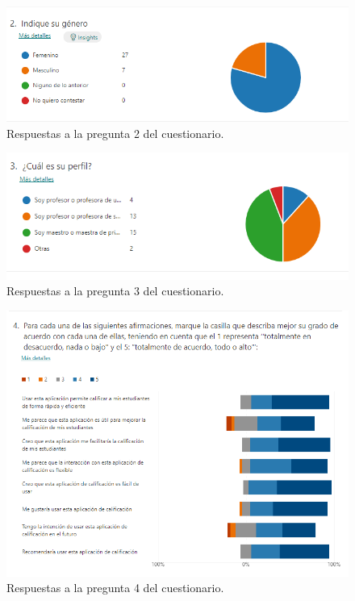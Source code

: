 \begin{figure}[h]
\centering\includegraphics[width=1\linewidth]{figs/cuestionario_2.png}
\caption{Respuestas a la pregunta 2 del cuestionario.}
\label{Fig:cuestionario_2}
\end{figure}

\begin{figure}[h]
\centering\includegraphics[width=1\linewidth]{figs/cuestionario_3.png}
\caption{Respuestas a la pregunta 3 del cuestionario.}
\label{Fig:cuestionario_3}
\end{figure}

\begin{figure}[h]
\centering\includegraphics[width=1\linewidth]{figs/cuestionario_4.png}
\caption{Respuestas a la pregunta 4 del cuestionario.}
\label{Fig:cuestionario_4}
\end{figure}

